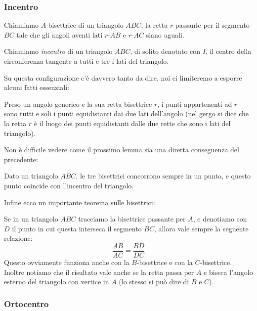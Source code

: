 \documentclass[11pt]{scrartcl}
\begin{document}
	\subsubsection{Incentro}
	\begin{definition}
		
		
		Chiamiamo $A$-bisettrice di un triangolo $ABC$, la retta $r$ passante per il segmento $BC$ tale che gli angoli aventi lati $r$-$AB$ e $r$-$AC$ siano uguali.
	\end{definition}
	\begin{definition}
		Chiamiamo \emph{incentro} di un triangolo $ABC$, di solito denotato con $I$, il centro della circonferenza tangente a tutti e tre i lati del triangolo. 
	\end{definition}
	Su questa configurazione c'è davvero tanto da dire, noi ci limiteremo a esporre alcuni fatti essenziali:
	\begin{lemma}
		Preso un angolo generico e la sua retta bisettrice $r$, i punti appartenenti ad $r$ sono tutti e soli i punti equidistanti dai due lati dell'angolo (nel gergo si dice che la retta $r$ è il luogo dei punti equidistanti dalle due rette che sono i lati del triangolo).
	\end{lemma}
	Non è difficile vedere come il prossimo lemma sia una diretta conseguenza del \mbox{precedente}:
	\begin{corollary}
		Dato un triangolo $ABC$, le tre bisettrici concorrono sempre in un punto, e questo punto coincide con l'incentro del triangolo.
	\end{corollary}
	Infine ecco un importante teorema sulle bisettrici:
	\begin{theorem}
		Se in un triangolo $ABC$ tracciamo la bisettrice passante per $A$, e denotiamo con $D$ il punto in cui questa interseca il segmento $BC$, allora vale sempre la seguente relazione:
		$$\frac{AB}{AC}=\frac{BD}{DC}$$
		Questo ovviamente funziona anche con la $B$-bisettrice e con la $C$-bisettrice. Inoltre notiamo che il risultato vale anche se la retta passa per $A$ e biseca l'angolo esterno del triangolo con vertice in $A$ (lo stesso si può dire di $B$ e $C$).
	\end{theorem}
	\subsubsection{Ortocentro}
	
\end{document}
